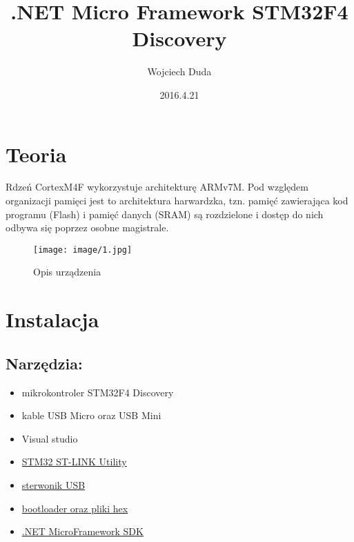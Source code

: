 \documentclass{article}
\title{.NET Micro Framework
STM32F4 Discovery}
\date{2016.4.21}
\author{Wojciech Duda}
\begin{document}
 
\maketitle 
{} 
\newpage
{}
\tableofcontents
\newpage
\section{Teoria}
Rdzeń CortexM4F wykorzystuje architekturę ARMv7M. Pod względem organizacji pamięci jest to architektura harwardzka, tzn. pamięć zawierająca kod programu (Flash) i pamięć danych (SRAM) są rozdzielone i dostęp do nich odbywa się poprzez osobne magistrale.

\begin{figure}[H]
\texttt{[image: image/1.jpg]}
\caption{Opis urządzenia}
\end{figure}
\section{Instalacja}
\subsection{Narzędzia:}
\begin{itemize}
\item mikrokontroler STM32F4 Discovery
\item kable USB Micro oraz USB Mini
\item Visual studio
\item \href{http://www.st.com/content/st_com/en/products/embedded-software/development-tool-software/stsw-link004.html}{STM32 ST-LINK Utility}
\item \href{www.codeplex.com/Download?ProjectName=netmf4stm32&DownloadId=471395}{sterwonik USB}
\item \href{www.codeplex.com/Download?ProjectName=netmf4stm32&DownloadId=471396}{bootloader oraz pliki hex}
\item \href {netmf.codeplex.com/releases/view/91594}{.NET MicroFramework SDK}
\end{itemize}
\end{document}
